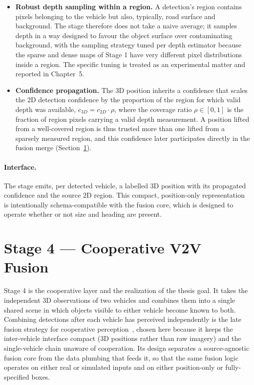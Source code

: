 \begin{itemize}[leftmargin=*,itemsep=4pt]
  \item \textbf{Robust depth sampling within a region.} A detection's region
  contains pixels belonging to the vehicle but also, typically, road surface and
  background. The stage therefore does not take a naive average; it samples depth in
  a way designed to favour the object surface over contaminating background, with
  the sampling strategy tuned per depth estimator because the sparse and dense maps
  of Stage 1 have very different pixel distributions inside a region. The specific
  tuning is treated as an experimental matter and reported in Chapter~5.
  \item \textbf{Confidence propagation.} The 3D position inherits a confidence that
  scales the 2D detection confidence by the proportion of the region for which valid
  depth was available, $c_{3D} = c_{2D} \cdot \rho$, where the coverage ratio
  $\rho \in [0, 1]$ is the fraction of region pixels carrying a valid depth
  measurement. A position lifted from a well-covered region is thus trusted more
  than one lifted from a sparsely measured region, and this confidence later
  participates directly in the fusion merge (Section~\ref{sec:stage4}).
\end{itemize}

\paragraph{Interface.} The stage emits, per detected vehicle, a labelled 3D
position with its propagated confidence and the source 2D region. This compact,
position-only representation is intentionally schema-compatible with the fusion
core, which is designed to operate whether or not size and heading are present.

\section{Stage 4 --- Cooperative V2V Fusion}
\label{sec:stage4}

Stage 4 is the cooperative layer and the realization of the thesis goal. It takes
the independent 3D observations of two vehicles and combines them into a single
shared scene in which objects visible to either vehicle become known to both.
Combining detections after each vehicle has perceived independently is the
late fusion strategy for cooperative perception~\cite{xu2022opv2v}, chosen
here because it keeps the inter-vehicle interface compact (3D positions rather than
raw imagery) and the single-vehicle chain unaware of cooperation. Its design
separates a source-agnostic fusion core from the data plumbing that
feeds it, so that the same fusion logic operates on either real or simulated inputs
and on either position-only or fully-specified boxes.

